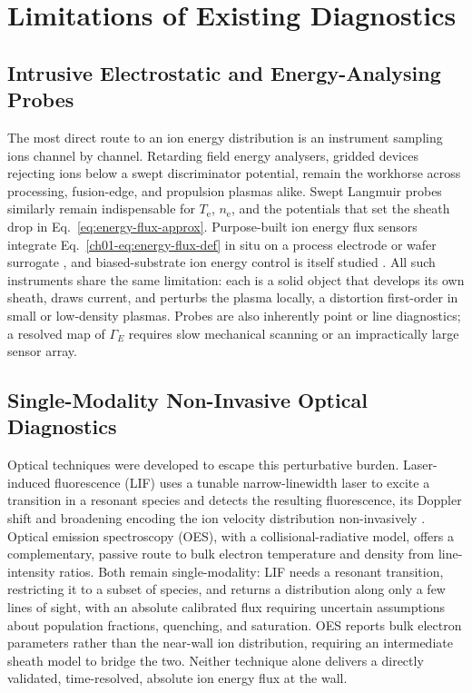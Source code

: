 \section{Limitations of Existing Diagnostics}

\subsection{Intrusive Electrostatic and Energy-Analysing Probes}

The most direct route to an ion energy distribution is an instrument sampling ions channel by channel. Retarding field energy analysers, gridded devices rejecting ions below a swept discriminator potential, remain the workhorse across processing, fusion-edge, and propulsion plasmas alike. Swept Langmuir probes similarly remain indispensable for $T_{\mathrm{e}}$, $n_{\mathrm{e}}$, and the potentials that set the sheath drop in Eq.~\eqref{eq:energy-flux-approx}. Purpose-built ion energy flux sensors integrate Eq.~\eqref{ch01-eq:energy-flux-def} in situ on a process electrode or wafer surrogate \cite{ref0075}, and biased-substrate ion energy control is itself studied \cite{ref0539}. All such instruments share the same limitation: each is a solid object that develops its own sheath, draws current, and perturbs the plasma locally, a distortion first-order in small or low-density plasmas. Probes are also inherently point or line diagnostics; a resolved map of $\Gamma_E$ requires slow mechanical scanning or an impractically large sensor array.

\subsection{Single-Modality Non-Invasive Optical Diagnostics}

Optical techniques were developed to escape this perturbative burden. Laser-induced fluorescence (LIF) uses a tunable narrow-linewidth laser to excite a transition in a resonant species and detects the resulting fluorescence, its Doppler shift and broadening encoding the ion velocity distribution non-invasively \cite{ref0292}. Optical emission spectroscopy (OES), with a collisional-radiative model, offers a complementary, passive route to bulk electron temperature and density from line-intensity ratios. Both remain single-modality: LIF needs a resonant transition, restricting it to a subset of species, and returns a distribution along only a few lines of sight, with an absolute calibrated flux requiring uncertain assumptions about population fractions, quenching, and saturation. OES reports bulk electron parameters rather than the near-wall ion distribution, requiring an intermediate sheath model to bridge the two. Neither technique alone delivers a directly validated, time-resolved, absolute ion energy flux at the wall.

